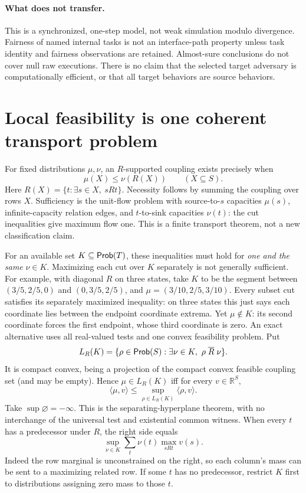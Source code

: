 \documentclass[11pt]{article}
\begin{document}
\paragraph{What does not transfer.} This is a synchronized, one-step model, not weak simulation modulo divergence. Fairness of named internal tasks is not an interface-path property unless task identity and fairness observations are retained. Almost-sure conclusions do not cover null raw executions. There is no claim that the selected target adversary is computationally efficient, or that all target behaviors are source behaviors.

\section{Local feasibility is one coherent transport problem}
For fixed distributions $\mu,\nu$, an $R$-supported coupling exists precisely when
\[
 \mu(X)\le\nu(R(X))\qquad(X\subseteq S).
\]
Here $R(X)=\{t:\exists s\in X,\ sRt\}$. Necessity follows by summing the coupling over rows $X$. Sufficiency is the unit-flow problem with source-to-$s$ capacities $\mu(s)$, infinite-capacity relation edges, and $t$-to-sink capacities $\nu(t)$: the cut inequalities give maximum flow one. This is a finite transport theorem, not a new classification claim.

For an available set $K\subseteq\mathsf{Prob}(T)$, these inequalities must hold for \emph{one and the same} $\nu\in K$. Maximizing each cut over $K$ separately is not generally sufficient. For example, with diagonal $R$ on three states, take $K$ to be the segment between $(3/5,2/5,0)$ and $(0,3/5,2/5)$, and $\mu=(3/10,2/5,3/10)$. Every subset cut satisfies its separately maximized inequality: on three states this just says each coordinate lies between the endpoint coordinate extrema. Yet $\mu\notin K$: its second coordinate forces the first endpoint, whose third coordinate is zero. An exact alternative uses all real-valued tests and one convex feasibility problem. Put
\[
 L_R(K)=\{\rho\in\Prob(S):\exists\nu\in K,\ \rho\mathrel{\overline R}\nu\}.
\]
It is compact convex, being a projection of the compact convex feasible coupling set (and may be empty). Hence $\mu\in L_R(K)$ iff for every $v\in\mathbb R^S$,
\[
 \langle\mu,v\rangle\le \sup_{\rho\in L_R(K)}\langle\rho,v\rangle.
\]
Take $\sup\varnothing=-\infty$. This is the separating-hyperplane theorem, with no interchange of the universal test and existential common witness. When every $t$ has a predecessor under $R$, the right side equals
\[
 \sup_{\nu\in K}\sum_t\nu(t)\max_{sRt}v(s).
\]
Indeed the row marginal is unconstrained on the right, so each column's mass can be sent to a maximizing related row. If some $t$ has no predecessor, restrict $K$ first to distributions assigning zero mass to those $t$.
\end{document}
